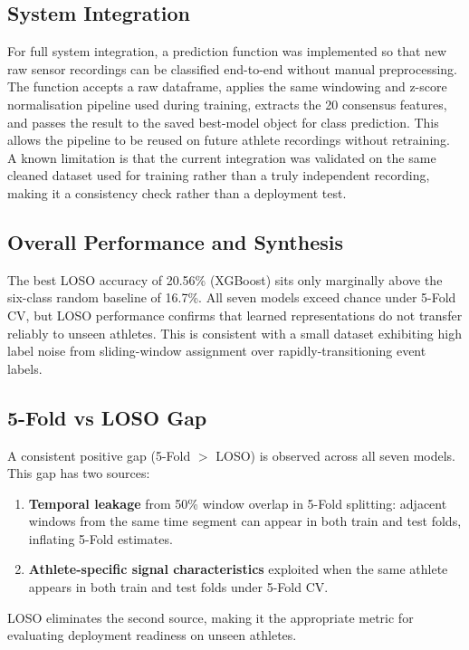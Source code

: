 \documentclass[12pt,a4paper]{cibb}
\begin{document}
\begin{table}[H]
\centering
{}
\caption{Most frequent misclassifications under LOSO evaluation.}
\label{tab:misclassifications}
\end{table}

\subsection{System Integration}
For full system integration, a prediction function was implemented so that new raw sensor recordings can be classified end-to-end without manual preprocessing. The function accepts a raw dataframe, applies the same windowing and z-score normalisation pipeline used during training, extracts the 20 consensus features, and passes the result to the saved best-model object for class prediction. This allows the pipeline to be reused on future athlete recordings without retraining. A known limitation is that the current integration was validated on the same cleaned dataset used for training rather than a truly independent recording, making it a consistency check rather than a deployment test.


\subsection{Overall Performance and Synthesis}
The best LOSO accuracy of 20.56\% (XGBoost) sits only marginally above the six-class random baseline of 16.7\%. All seven models exceed chance under 5-Fold CV, but LOSO performance confirms that learned representations do not transfer reliably to unseen athletes. This is consistent with a small dataset exhibiting high label noise from sliding-window assignment over rapidly-transitioning event labels.

\subsection{5-Fold vs LOSO Gap}
A consistent positive gap (5-Fold $>$ LOSO) is observed across all seven models. This gap has two sources:
\begin{enumerate}
    \item \textbf{Temporal leakage} from 50\% window overlap in 5-Fold splitting: adjacent windows from the same time segment can appear in both train and test folds, inflating 5-Fold estimates.
    \item \textbf{Athlete-specific signal characteristics} exploited when the same athlete appears in both train and test folds under 5-Fold CV.
\end{enumerate}
LOSO eliminates the second source, making it the appropriate metric for evaluating deployment readiness on unseen athletes.
\end{document}
